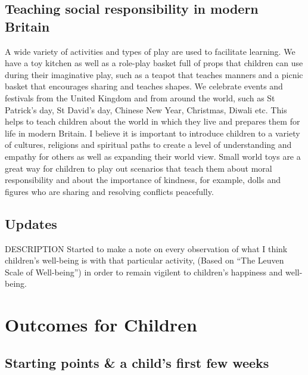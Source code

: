 \documentclass[10pt,a4paper]{report}
\makeatletter
\newcommand{\DESCRIPTION@original@item}{}
\let\DESCRIPTION@original@item\item
\newcommand*{\DESCRIPTION@envir}{DESCRIPTION}
\newlength{\DESCRIPTION@totalleftmargin}
\newlength{\DESCRIPTION@linewidth}
\newcommand{\DESCRIPTION@makelabel}[1]{\llap{#1}}%
\newcommand{\DESCRIPTION@item}[1][]{%
  \setlength{\@totalleftmargin}%
       {\DESCRIPTION@totalleftmargin+\widthof{\textbf{#1 }}-\leftmargin}%
  \setlength{\linewidth}
       {\DESCRIPTION@linewidth-\widthof{\textbf{#1 }}+\leftmargin}%
  \par\parshape \@ne \@totalleftmargin \linewidth
  \DESCRIPTION@original@item[\textbf{#1}]%
}
\newenvironment{DESCRIPTION}
  {\list{}{\setlength{\labelwidth}{0cm}%
           \let\makelabel\DESCRIPTION@makelabel}%
   \setlength{\DESCRIPTION@totalleftmargin}{\@totalleftmargin}%
   \setlength{\DESCRIPTION@linewidth}{\linewidth}%
   \renewcommand{\item}{\ifx\@currenvir\DESCRIPTION@envir
                           \expandafter\DESCRIPTION@item
                        \else
                           \expandafter\DESCRIPTION@original@item
                        \fi}}
  {\endlist}
\makeatother
\begin{document}
\section{Teaching social responsibility in modern Britain}

A wide variety of activities and types of play are used to facilitate learning. We have a toy kitchen as well as a role-play basket full of props that children can use during their imaginative play, such as a teapot that teaches manners and a picnic basket that encourages sharing and teaches shapes. We celebrate events and festivals from the United Kingdom and from around the world, such as St Patrick's day, St David's day, Chinese New Year, Christmas, Diwali etc. This helps to teach children about the world in which they live and prepares them for life in modern Britain. I believe it is important to introduce children to a variety of cultures, religions and spiritual paths to create a level of understanding and empathy for others as well as expanding their world view. Small world toys are a great way for children to play out scenarios that teach them about moral responsibility and about the importance of kindness, for example, dolls and figures who are sharing and resolving conflicts peacefully.

\section{Updates}

\begin{DESCRIPTION}
\item [June 2016] Started to make a note on every observation of what I think children's well-being is with that particular activity, (Based on “The Leuven Scale of Well-being”) in order to remain vigilent to children's happiness and well-being.
\end{DESCRIPTION}

\chapter{Outcomes for Children}

\section{Starting points \& a child's first few weeks}
\end{document}
